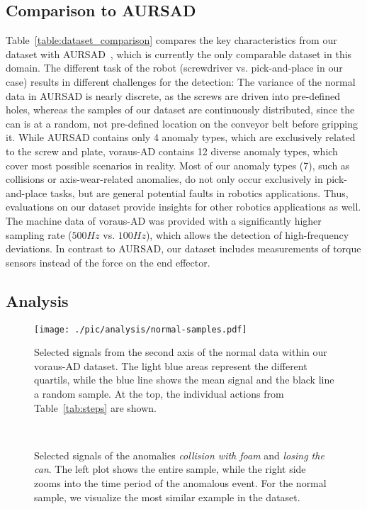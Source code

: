 \documentclass[journal]{IEEEtran}
\newcommand\datasetname{voraus-AD}
\begin{document}
\subsection{Comparison to AURSAD}
\label{dataset_comparison}
Table~\ref{table:dataset_comparison} compares the key characteristics from our dataset with AURSAD~\cite{aursad}, which is currently the only comparable dataset in this domain.
The different task of the robot (screwdriver vs. pick-and-place in our case) results in different challenges for the detection:
The variance of the normal data in AURSAD is nearly discrete, as the screws are driven into pre-defined holes, whereas the samples of our dataset are continuously distributed, since the can is at a random, not pre-defined location on the conveyor belt before gripping it.
While AURSAD contains only 4 anomaly types, which are exclusively related to the screw and plate, \datasetname{} contains 12 diverse anomaly types, which cover most possible scenarios in reality.
Most of our anomaly types (7), such as collisions or axis-wear-related anomalies, do not only occur exclusively in pick-and-place tasks, but are general potential faults in robotics applications.
Thus, evaluations on our dataset provide insights for other robotics applications as well.
The machine data of \datasetname{} was provided with a significantly higher sampling rate ($500Hz$ vs. $100Hz$), which allows the detection of high-frequency deviations.
In contrast to AURSAD, our dataset includes measurements of torque sensors instead of the force on the end effector.

\subsection{Analysis}
\begin{figure}[!t]
    \centering
    \texttt{[image: ./pic/analysis/normal-samples.pdf]}
    \caption{Selected signals from the second axis of the normal data within our \datasetname{} dataset. The light blue areas represent the different quartils, while the blue line shows the mean signal and the black line a random sample. At the top, the individual actions from Table~\ref{tab:steps} are shown.}
    \label{fig:normal_quali}
    \vspace{-4mm}
\end{figure}


\begin{figure}[!htb]
    \centering
    \\
    \vspace{-2mm}
    \caption{Selected signals of the anomalies \textit{collision with foam} and \textit{losing the can}. The left plot shows the entire sample, while the right side zooms into the time period of the anomalous event. For the normal sample, we visualize the most similar example in the dataset.}
    \label{fig:ano_signals}
    \vspace{-3mm}
\end{figure}
\end{document}
